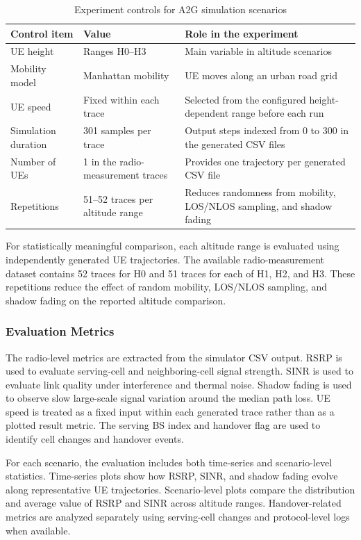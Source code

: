 \begin{table}[H]
\centering
\caption{Experiment controls for A2G simulation scenarios}
\small
\begin{tabularx}{\textwidth}{p{4.0cm}p{3.4cm}X}
\toprule
Control item & Value & Role in the experiment\\
\midrule
UE height & Ranges H0--H3 & Main variable in altitude scenarios\\
Mobility model & Manhattan mobility & UE moves along an urban road grid\\
UE speed & Fixed within each trace & Selected from the configured height-dependent range before each run\\
Simulation duration & 301 samples per trace & Output steps indexed from 0 to 300 in the generated CSV files\\
Number of UEs & 1 in the radio-measurement traces & Provides one trajectory per generated CSV file\\
Repetitions & 51--52 traces per altitude range & Reduces randomness from mobility, LOS/NLOS sampling, and shadow fading\\
\bottomrule
\end{tabularx}
\label{tab:a2g-simulation-settings}
\end{table}

For statistically meaningful comparison, each altitude range is evaluated using independently generated UE trajectories. The available radio-measurement dataset contains 52 traces for H0 and 51 traces for each of H1, H2, and H3. These repetitions reduce the effect of random mobility, LOS/NLOS sampling, and shadow fading on the reported altitude comparison.

\subsubsection{Evaluation Metrics}

The radio-level metrics are extracted from the simulator CSV output. RSRP is used to evaluate serving-cell and neighboring-cell signal strength. SINR is used to evaluate link quality under interference and thermal noise. Shadow fading is used to observe slow large-scale signal variation around the median path loss. UE speed is treated as a fixed input within each generated trace rather than as a plotted result metric. The serving BS index and handover flag are used to identify cell changes and handover events.

For each scenario, the evaluation includes both time-series and scenario-level statistics. Time-series plots show how RSRP, SINR, and shadow fading evolve along representative UE trajectories. Scenario-level plots compare the distribution and average value of RSRP and SINR across altitude ranges. Handover-related metrics are analyzed separately using serving-cell changes and protocol-level logs when available.

